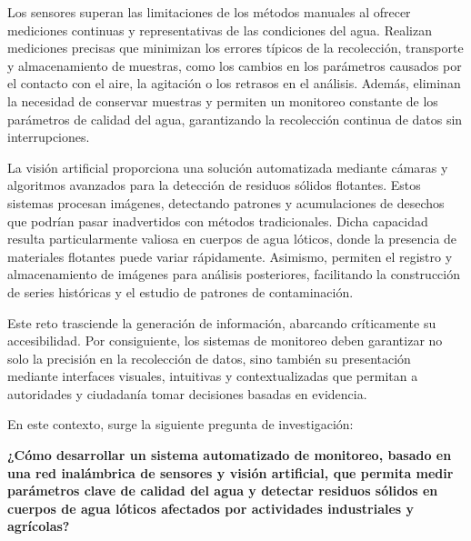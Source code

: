 Los sensores superan las limitaciones de los métodos manuales al ofrecer mediciones continuas y representativas de las condiciones del agua. Realizan mediciones precisas que minimizan los errores típicos de la recolección, transporte y almacenamiento de muestras, como los cambios en los parámetros causados por el contacto con el aire, la agitación o los retrasos en el análisis. Además, eliminan la necesidad de conservar muestras y permiten un monitoreo constante de los parámetros de calidad del agua, garantizando la recolección continua de datos sin interrupciones.

La visión artificial proporciona una solución automatizada mediante cámaras y algoritmos avanzados para la detección de residuos sólidos flotantes. Estos sistemas procesan imágenes, detectando patrones y acumulaciones de desechos que podrían pasar inadvertidos con métodos tradicionales. Dicha capacidad resulta particularmente valiosa en cuerpos de agua lóticos, donde la presencia de materiales flotantes puede variar rápidamente. Asimismo, permiten el registro y almacenamiento de imágenes para análisis posteriores, facilitando la construcción de series históricas y el estudio de patrones de contaminación.

Este reto trasciende la generación de información, abarcando críticamente su accesibilidad. Por consiguiente, los sistemas de monitoreo deben garantizar no solo la precisión en la recolección de datos, sino también su presentación mediante interfaces visuales, intuitivas y contextualizadas que permitan a autoridades y ciudadanía tomar decisiones basadas en evidencia.

En este contexto, surge la siguiente pregunta de investigación:

\textbf{¿Cómo desarrollar un sistema automatizado de monitoreo, basado en una red inalámbrica de sensores y visión artificial, que permita medir parámetros clave de calidad del agua y detectar residuos sólidos en cuerpos de agua lóticos afectados por actividades industriales y agrícolas?}
